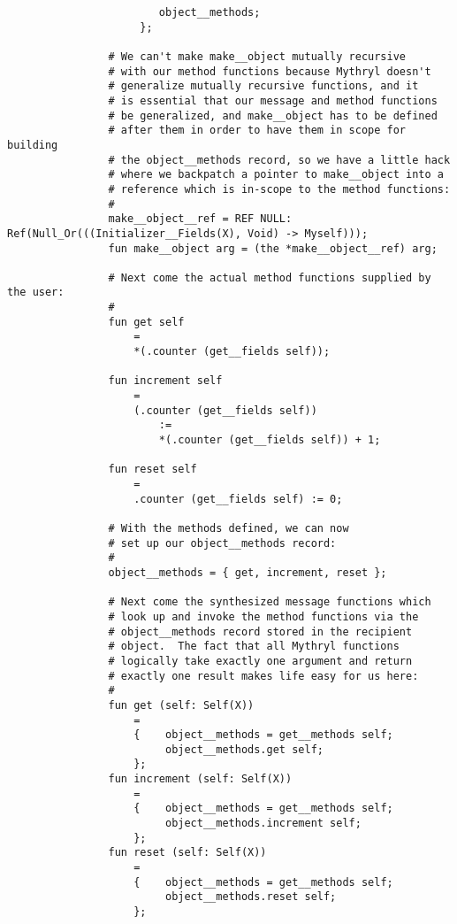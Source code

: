 \begin{verbatim}
                        object__methods;
                     };

                # We can't make make__object mutually recursive
                # with our method functions because Mythryl doesn't
                # generalize mutually recursive functions, and it
                # is essential that our message and method functions
                # be generalized, and make__object has to be defined
                # after them in order to have them in scope for building
                # the object__methods record, so we have a little hack
                # where we backpatch a pointer to make__object into a
                # reference which is in-scope to the method functions:
                #
                make__object__ref = REF NULL: Ref(Null_Or(((Initializer__Fields(X), Void) -> Myself)));
                fun make__object arg = (the *make__object__ref) arg;

                # Next come the actual method functions supplied by the user:
                # 
                fun get self
                    =
                    *(.counter (get__fields self));

                fun increment self
                    =
                    (.counter (get__fields self))
                        :=
                        *(.counter (get__fields self)) + 1;

                fun reset self
                    =
                    .counter (get__fields self) := 0;

                # With the methods defined, we can now
                # set up our object__methods record:
                #
                object__methods = { get, increment, reset };

                # Next come the synthesized message functions which
                # look up and invoke the method functions via the
                # object__methods record stored in the recipient
                # object.  The fact that all Mythryl functions
                # logically take exactly one argument and return
                # exactly one result makes life easy for us here:
                #
                fun get (self: Self(X))
                    =
                    {    object__methods = get__methods self;
                         object__methods.get self;
                    };
                fun increment (self: Self(X))
                    =
                    {    object__methods = get__methods self;
                         object__methods.increment self;
                    };
                fun reset (self: Self(X))
                    =
                    {    object__methods = get__methods self;
                         object__methods.reset self;
                    };


\end{verbatim}
